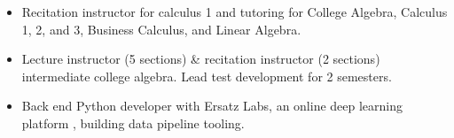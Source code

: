 \documentclass[10pt,a4paper,ragged2e]{altacv}
\begin{document}
\divider


\begin{itemize}
\item Recitation instructor for calculus 1 and tutoring for College Algebra, Calculus 1, 2, and 3, Business Calculus, and Linear Algebra.
\end{itemize}

\divider


\begin{itemize}
\item Lecture instructor (5 sections) {\&} recitation instructor (2 sections) intermediate college algebra. Lead test development for 2 semesters.
\end{itemize}
\divider


\begin{itemize}
\item Back end Python developer with Ersatz Labs, an online deep learning platform , building data pipeline tooling.
\end{itemize}




\end{document}
